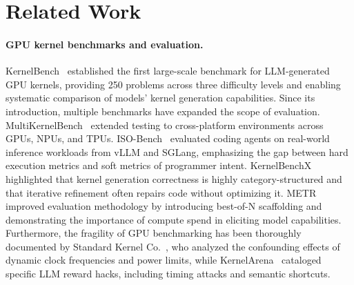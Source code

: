 \documentclass[11pt]{article}
\begin{document}



\newpage
\appendix

\section{Related Work}
\label{app:related}

\paragraph{GPU kernel benchmarks and evaluation.}
KernelBench~\cite{kernelbench} established the first large-scale benchmark for LLM-generated GPU kernels, providing 250 problems across three difficulty levels and enabling systematic comparison of models' kernel generation capabilities.
Since its introduction, multiple benchmarks have expanded the scope of evaluation. MultiKernelBench~\cite{wen2025multikernelbench} extended testing to cross-platform environments across GPUs, NPUs, and TPUs. ISO-Bench~\cite{nangia2026isobench} evaluated coding agents on real-world inference workloads from vLLM and SGLang, emphasizing the gap between hard execution metrics and soft metrics of programmer intent. KernelBenchX~\cite{wang2026kernelbenchx} highlighted that kernel generation correctness is highly category-structured and that iterative refinement often repairs code without optimizing it. METR~\cite{metr} improved evaluation methodology by introducing best-of-N scaffolding and demonstrating the importance of compute spend in eliciting model capabilities. Furthermore, the fragility of GPU benchmarking has been thoroughly documented by Standard Kernel Co.~\cite{standardkernel2026faster}, who analyzed the confounding effects of dynamic clock frequencies and power limits, while KernelArena~\cite{kernelarena2026resources} cataloged specific LLM reward hacks, including timing attacks and semantic shortcuts.
\end{document}
